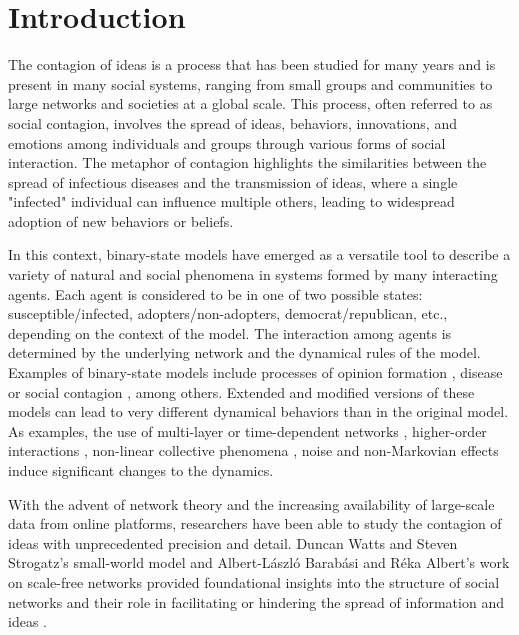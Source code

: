 \section{\label{sec:Introduction} Introduction}

The contagion of ideas is a process that has been studied for many years and is present in many social systems, ranging from small groups and communities to large networks and societies at a global scale. This process, often referred to as social contagion, involves the spread of ideas, behaviors, innovations, and emotions among individuals and groups through various forms of social interaction. The metaphor of contagion highlights the similarities between the spread of infectious diseases and the transmission of ideas, where a single "infected" individual can influence multiple others, leading to widespread adoption of new behaviors or beliefs.

In this context, binary-state models have emerged as a versatile tool to describe a variety of natural and social phenomena in systems formed by many interacting agents. Each agent is considered to be in one of two possible states: susceptible/infected, adopters/non-adopters, democrat/republican, etc., depending on the context of the model. The interaction among agents is determined by the underlying network and the dynamical rules of the model. Examples of binary-state models include processes of opinion formation \cite{Voter-original,sood-2005,fernandez-gracia-2014,redner-2019}, disease or social contagion \cite{granovetter-1978,pastor-satorras-2015}, among others. Extended and modified versions of these models can lead to very different dynamical behaviors than in the original model. As examples, the use of multi-layer  \cite{diakonova-2014,diakonova-2016,amato-2017} or time-dependent networks \cite{vazquez-2008}, higher-order interactions \cite{de-arruda-2020, iacopini-2019, cencetti-2021}, non-linear collective phenomena \cite{castellano-2009,peralta-2018}, noise \cite{carro-2016} and non-Markovian \cite{van-mieghem-2013,starnini-2017,peralta-2020A,chen-2020} effects induce significant changes to the dynamics.

With the advent of network theory and the increasing availability of large-scale data from online platforms, researchers have been able to study the contagion of ideas with unprecedented precision and detail. Duncan Watts and Steven Strogatz's small-world model \cite{watts1998collective} and Albert-László Barabási and Réka Albert's work on scale-free networks provided foundational insights into the structure of social networks and their role in facilitating or hindering the spread of information and ideas \cite{barabasi2009scale}.

